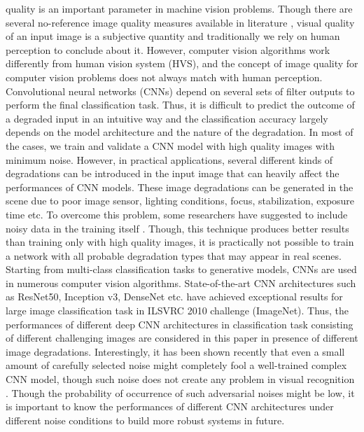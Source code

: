\documentclass[10pt, journal, compsoc]{IEEEtran}
\begin{document}
 quality is an important parameter in machine vision problems. Though there are several no-reference image quality measures available in literature \cite{mittal2012no}, visual quality of an input image is a subjective quantity and traditionally we rely on human perception to conclude about it. However, computer vision algorithms work differently from human vision system (HVS), and the concept of image quality for computer vision problems does not always match with human perception. Convolutional neural networks (CNNs) depend on several sets of filter outputs to perform the final classification task. Thus, it is difficult to predict the outcome of a degraded input in an intuitive way and the classification accuracy largely depends on the model architecture and the nature of the degradation. In most of the cases, we train and validate a CNN model with high quality images with minimum noise. However, in practical applications, several different kinds of degradations can be introduced in the input image that can heavily affect the performances of CNN models. These image degradations can be generated in the scene due to poor image sensor, lighting conditions, focus, stabilization, exposure time etc. To overcome this problem, some researchers have suggested to include noisy data in the training itself \cite{dodge2016understanding}. Though, this technique produces better results than training only with high quality images, it is practically not possible to train a network with all probable degradation types that may appear in real scenes. Starting from multi-class classification tasks to generative models, CNNs are used in numerous computer vision algorithms. State-of-the-art CNN architectures such as ResNet50, Inception v3, DenseNet etc. \cite{howard2017mobilenets, simonyan2014very, he2016deep} have achieved exceptional results for large image classification task in ILSVRC 2010 challenge (ImageNet). Thus, the performances of different deep CNN architectures in classification task consisting of different challenging images are considered in this paper in presence of different image degradations. Interestingly, it has been shown recently that even a small amount of carefully selected noise might completely fool a well-trained complex CNN model, though such noise does not create any problem in visual recognition \cite{moosavi2016deepfool}. Though the probability of occurrence of such adversarial noises might be low, it is important to know the performances of different CNN architectures under different noise conditions to build more robust systems in future.
\end{document}
